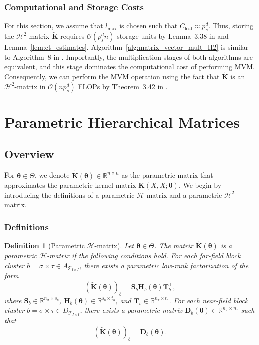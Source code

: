 \documentclass[final,3p,times]{elsarticle}
\newcommand{\mc}[1]{\mathcal{#1}}
\renewcommand{\vec}[1]{\boldsymbol{#1}}
\newcommand{\mat}[1]{\boldsymbol{#1}}
\newcommand{\R}{\mathbb{R}}
\newcommand{\mathat}[1]{\widetilde{\boldsymbol{#1}}}
\newtheorem{definition}{Definition}
\begin{document}
\subsubsection{Computational and Storage Costs}\label{sec:H2_mat_costs}
For this section, we assume that $l_{\max}$ is chosen such that $C_{\text{leaf}} \approx p_s^d$. Thus, storing the $\mc{H}^{2}$-matrix $\mathat{K}$ requires $\mc{O}(p_s^dn)$ storage units by Lemma~3.38 in \cite{borm2010efficient} and Lemma~\ref{lem:ct_estimates}. Algorithm~\ref{alg:matrix_vector_mult_H2} is similar to Algorithm~8 in \cite{borm2010efficient}. Importantly, the multiplication stages of both algorithms are equivalent, and this stage dominates the computational cost of performing MVM. Consequently, we can perform the MVM operation  using the fact that $\mathat{K}$ is an $\mc{H}^{2}$-matrix in $\mc{O}(n p_s^d)$ FLOPs by Theorem~3.42 in \cite{borm2010efficient}. 




\section{Parametric Hierarchical Matrices} \label{sec:param_h_mat}

\subsection{Overview}
 For $\vec{\theta} \in \Theta$, we denote $\mathat{K}(\vec{\theta}) \in \R^{n \times n}$ as the parametric matrix that approximates the parametric kernel matrix $\mat{K}({X}, {X}; \vec{\theta})$. We begin by introducing the definitions of a parametric $\mc{H}$-matrix and a parametric $\mc{H}^{2}$-matrix.
\subsubsection{Definitions}
\begin{definition}[Parametric $\mc{H}$-matrix]\label{def:param_h_matrix}
Let $\vec{\theta} \in \Theta$. The matrix $\mathat{K}(\vec{\theta})$ is a \emph{parametric $\mc{H}$-matrix} if the following conditions hold. For each far-field block cluster $b = \sigma \times \tau \in A_{\mc{T}_{I \times I}}$, there exists a parametric low-rank factorization of the form
   \begin{equation}\label{eqn:param_h_matrix_ff_eqn}
   (\mathat{K}(\vec{\theta}))_b = \mat{S}_{b}\mat{H}_{b}(\vec{\theta})\mat{T}_{b}^{\top},
   \end{equation}
   where $\mat{S}_{b} \in \R^{n_{\sigma} \times s_b}$, $\mat{H}_{b}(\vec{\theta}) \in \R^{s_b \times t_b}$, and $\mat{T}_{b} \in \R^{n_{\tau} \times t_{b}}$. For each near-field block cluster $b = \sigma \times \tau \in D_{\mc{T}_{I \times I}}$, there exists a parametric matrix $\mat{D}_{b}(\vec{\theta}) \in \R^{n_{\sigma} \times n_{\tau}}$ such that
   \begin{equation}\label{eqn:param_h_matrix_nf_eqn}
   (\mathat{K}(\vec{\theta}))_b = \mat{D}_{b}(\vec{\theta}).
   \end{equation}

\end{definition}
\end{document}
